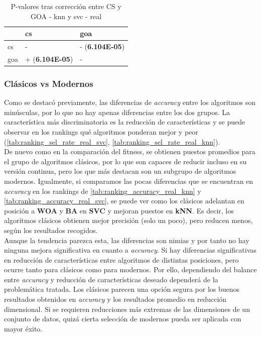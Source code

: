 \begin{table}
    \centering
    \begin{tabular}{lll}
        \toprule
        {}  & cs                     & goa                    \\
        \midrule
        cs  & -                      & - (\textbf{6.104E-05}) \\
        goa & + (\textbf{6.104E-05}) & -                      \\
        \bottomrule
    \end{tabular}
    \caption{P-valores tras corrección entre CS y GOA - knn y svc - real}
    \label{tab:pval_corr_best-worst-real_svc_knn}
\end{table}

\subsubsection{Clásicos vs Modernos}
Como se destacó previamente, las diferencias de \textit{accuracy} entre los algoritmos son minúsculas, por lo que no hay apenas diferencias entre los dos grupos. La característica más discriminatoria es la reducción de características y se puede observar en los rankings qué algoritmos ponderan mejor y peor (\ref{tab:ranking_sel_rate_real_svc}, \ref{tab:ranking_sel_rate_real_knn}).\\[6pt]
De nuevo como en la comparación del fitness, se obtienen puestos promedios para el grupo de algoritmos clásicos, por lo que son capaces de reducir incluso en su versión continua, pero los que más destacan son un subgrupo de algoritmos modernos. Igualmente, si comparamos las pocas diferencias que se encuentran en \textit{accuracy} en los rankings de \ref{tab:ranking_accuracy_real_knn} y \ref{tab:ranking_accuracy_real_svc}, se puede ver como los clásicos adelantan en posición a \textbf{WOA} y \textbf{BA} en \textbf{SVC} y mejoran puestos en \textbf{kNN}. Es decir, los algoritmos clásicos obtienen mejor precisión (solo un poco), pero reducen menos, según los resultados recogidos.\\[6pt]
Aunque la tendencia parezca esta, las diferencias son nimias y por tanto no hay ninguna mejora significativa en cuanto a \textit{accuracy}. Si hay diferencias significativas en reducción de características entre algoritmos de distintas posiciones, pero ocurre tanto para clásicos como para modernos. Por ello, dependiendo del balance entre \textit{accuracy} y reducción de características  deseado dependerá de la problemática tratada. Los clásicos parecen una opción segura por los buenos resultados obtenidos en \textit{accuracy} y los resultados promedio en reducción dimensional. Si se requieren reducciones más extremas de las dimensiones de un conjunto de datos, quizá cierta selección de modernos pueda ser aplicada con mayor éxito.

